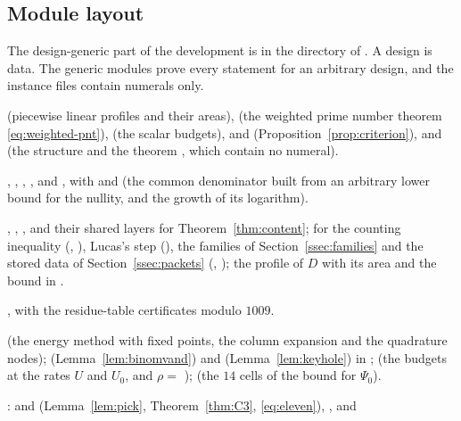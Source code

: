 \subsection{Module layout}
The design-generic part of the development is in the directory  of . A design is
data. The generic modules prove every statement for an arbitrary design, and the instance files contain
numerals only.
\begin{description}[leftmargin=1.5em,style=nextline]\sloppy
\item[Generic layer]  (piecewise linear profiles and their areas),  (the weighted
prime number theorem \eqref{eq:weighted-pnt}),  (the scalar budgets),  and
 (Proposition~\ref{prop:criterion}), and  (the structure  and the
theorem , which contain no numeral).
\item[Denominators] , , , ,
 and , with  and  (the
common denominator built from an arbitrary lower bound for the nullity, and the growth of its logarithm).
\item[Rank deficiencies] , , ,  and their shared layers for
Theorem~\ref{thm:content};  for the counting inequality (, ),
Lucas's step (), the families of Section~\ref{ssec:families} and the stored data of
Section~\ref{ssec:packets} (, ); the profile of $D$ with its area
 and the bound  in .
\item[Nonvanishing] , with the residue-table certificates modulo $1009$.
\item[Real place, perturbation]  (the energy method with fixed points, the column expansion
and the quadrature nodes);  (Lemma~\ref{lem:binomvand}) and 
(Lemma~\ref{lem:keyhole}) in ;  (the budgets at the rates $U$ and $U_0$,
and $\rho=$ );  (the $14$ cells of the bound for $\Psi_0$).
\item[Real place, signed bound] :  and 
(Lemma~\ref{lem:pick}, Theorem~\ref{thm:C3}, \eqref{eq:eleven}), ,  and

\end{description}
